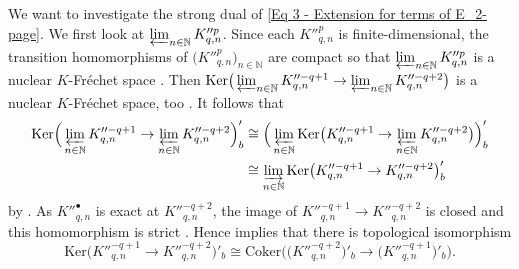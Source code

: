 \documentclass[a4paper, reqno, 10pt]{amsart}
\theoremstyle{definition}
\numberwithin{equation}{section}
\newcommand{\Coker}{{\mathrm{Coker}}}
\newcommand{\Ker}{{\mathrm{Ker}}}
\newcommand{\ra}{\rightarrow}
\newcommand{\BN}{{\mathbb {N}}}
\begin{document}
We want to investigate the strong dual of \eqref{Eq 3 - Extension for terms of E_2-page}.
We first look at $\varprojlim_{n\in \BN} K''^{p}_{q,n}$.
Since each $K''^p_{q,n}$ is finite-dimensional, the transition homomorphisms of $\big(K''^p_{q,n}\big)_{n\in \BN}$ are compact \cite[Lemma 16.4]{Schneider02NonArchFunctAna} so that $\varprojlim_{n\in \BN} K''^{p}_{q,n}$ is a nuclear $K$-Fr\'echet space \cite[Prop.\ 19.9]{Schneider02NonArchFunctAna}.
Then $\Ker\big( \varprojlim_{n\in \BN} K''^{ -q+1}_{q,n} \ra \varprojlim_{n\in \BN} K''^{-q+2}_{q,n} \big)$ is a nuclear $K$-Fr\'echet space, too \cite[Prop.\ 19.4 (i)]{Schneider02NonArchFunctAna}.
It follows that 
\begin{align*}
	\Ker \Big( \varprojlim_{n\in \BN} K''^{-q+1}_{q,n} \ra \varprojlim_{n\in \BN} K''^{-q+2}_{q,n} \Big)'_b 
	&\cong \Big(\varprojlim_{n\in \BN} \Ker \big( K''^{-q+1}_{q,n} \ra \varprojlim_{n\in \BN} K''^{-q+2}_{q,n} \big) \Big)'_b \\
	&\cong \varinjlim_{n\in \BN} \Ker \big( K''^{-q+1}_{q,n} \ra  K''^{-q+2}_{q,n} \big)'_b
\end{align*}
by \cite[Prop.\ 16.5]{Schneider02NonArchFunctAna}.
As $K''^\bullet_{q,n}$ is exact at $K''^{-q+2}_{q,n}$, the image of $K''^{-q+1}_{q,n} \ra  K''^{-q+2}_{q,n}$ is closed and this homomorphism is strict \cite[IV.\ \S 4.2 Thm.\ 1]{Bourbaki87TopVectSp1to5}.
Hence \cite[IV.\ \S 4.1 Prop.\ 2]{Bourbaki87TopVectSp1to5} implies that there is topological isomorphism
\begin{equation*}
	\Ker \big( K''^{-q+1}_{q,n} \ra  K''^{-q+2}_{q,n} \big)'_b
	\cong \Coker\Big( \big(K''^{ -q+2}_{q,n}\big)'_b \ra \big(K''^{-q+1}_{q,n}\big)'_b \Big) .
\end{equation*}
\end{document}
